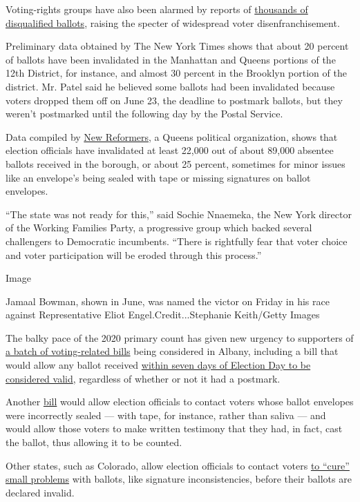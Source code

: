 Voting-rights groups have also been alarmed by reports of
\href{https://theintercept.com/2020/07/16/new-york-mail-in-ballots-thrown-out/}{thousands
of disqualified ballots}, raising the specter of widespread voter
disenfranchisement.

Preliminary data obtained by The New York Times shows that about 20
percent of ballots have been invalidated in the Manhattan and Queens
portions of the 12th District, for instance, and almost 30 percent in
the Brooklyn portion of the district. Mr. Patel said he believed some
ballots had been invalidated because voters dropped them off on June 23,
the deadline to postmark ballots, but they weren't postmarked until the
following day by the Postal Service.

Data compiled by \href{https://www.newreformers.org/candidates}{New
Reformers}, a Queens political organization, shows that election
officials have invalidated at least 22,000 out of about 89,000 absentee
ballots received in the borough, or about 25 percent, sometimes for
minor issues like an envelope's being sealed with tape or missing
signatures on ballot envelopes.

``The state was not ready for this,'' said Sochie Nnaemeka, the New York
director of the Working Families Party, a progressive group which backed
several challengers to Democratic incumbents. ``There is rightfully fear
that voter choice and voter participation will be eroded through this
process.''

Image

Jamaal Bowman, shown in June, was named the victor on Friday in his race
against Representative Eliot Engel.Credit...Stephanie Keith/Getty Images

The balky pace of the 2020 primary count has given new urgency to
supporters of \href{https://letnyvote.org/covid-19}{a batch of
voting-related bills} being considered in Albany, including a bill that
would allow any ballot received
\href{https://legislation.nysenate.gov/pdf/bills/2019/S8367}{within
seven days of Election Day to be considered valid}, regardless of
whether or not it had a postmark.

Another
\href{https://legislation.nysenate.gov/pdf/bills/2019/S8369}{bill} would
allow election officials to contact voters whose ballot envelopes were
incorrectly sealed --- with tape, for instance, rather than saliva ---
and would allow those voters to make written testimony that they had, in
fact, cast the ballot, thus allowing it to be counted.

Other states, such as Colorado, allow election officials to contact
voters
\href{https://www.ncsl.org/research/elections-and-campaigns/vopp-table-15-states-that-permit-voters-to-correct-signature-discrepancies.aspx}{to
``cure'' small problems} with ballots, like signature inconsistencies,
before their ballots are declared invalid.

